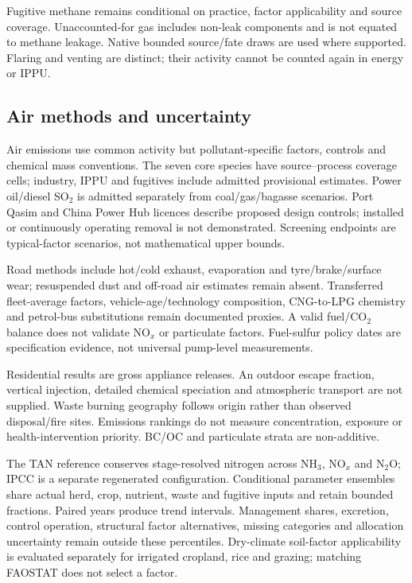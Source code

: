 \label{lim:fugitive-envelope}
Fugitive methane remains conditional on practice, factor applicability and source coverage. Unaccounted-for gas includes non-leak components and is not equated to methane leakage. Native bounded source/fate draws are used where supported. Flaring and venting are distinct; their activity cannot be counted again in energy or IPPU.

\subsection{Air methods and uncertainty}
\label{lim:air-pollutants}\label{lim:tier1}
Air emissions use common activity but pollutant-specific factors, controls and chemical mass conventions. The seven core species have source--process coverage cells; industry, IPPU and fugitives include admitted provisional estimates. Power oil/diesel SO$_2$ is admitted separately from coal/gas/bagasse scenarios. Port Qasim and China Power Hub licences describe proposed design controls; installed or continuously operating removal is not demonstrated. Screening endpoints are typical-factor scenarios, not mathematical upper bounds.

Road methods include hot/cold exhaust, evaporation and tyre/brake/surface wear; resuspended dust and off-road air estimates remain absent. Transferred fleet-average factors, vehicle-age/technology composition, CNG-to-LPG chemistry and petrol-bus substitutions remain documented proxies. A valid fuel/CO$_2$ balance does not validate NO$_x$ or particulate factors. Fuel-sulfur policy dates are specification evidence, not universal pump-level measurements.

Residential results are gross appliance releases. An outdoor escape fraction, vertical injection, detailed chemical speciation and atmospheric transport are not supplied. Waste burning geography follows origin rather than observed disposal/fire sites. Emissions rankings do not measure concentration, exposure or health-intervention priority. BC/OC and particulate strata are non-additive.

The TAN reference conserves stage-resolved nitrogen across NH$_3$, NO$_x$ and N$_2$O; IPCC is a separate regenerated configuration. Conditional parameter ensembles share actual herd, crop, nutrient, waste and fugitive inputs and retain bounded fractions. Paired years produce trend intervals. Management shares, excretion, control operation, structural factor alternatives, missing categories and allocation uncertainty remain outside these percentiles. Dry-climate soil-factor applicability is evaluated separately for irrigated cropland, rice and grazing; matching FAOSTAT does not select a factor.

